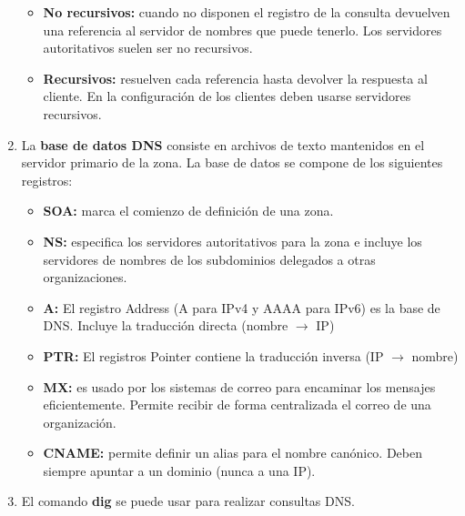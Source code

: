 \begin{enumerate}
\begin{itemize}
        \item \textbf{No recursivos: }cuando no disponen el registro de la consulta devuelven una referencia al servidor de nombres que puede tenerlo. Los servidores autoritativos suelen ser no recursivos.
        \item \textbf{Recursivos: }resuelven cada referencia hasta devolver la respuesta al cliente. En la configuración de los clientes deben usarse servidores recursivos.
    \end{itemize}
    \item La \textbf{base de datos DNS} consiste en archivos de texto  mantenidos en el servidor primario de la zona. La base de datos se compone de los siguientes registros:
    \begin{itemize}
        \item \textbf{SOA: }marca el comienzo de definición de una zona.
        \item \textbf{NS: }especifica los servidores autoritativos para la zona e incluye los servidores de nombres de los subdominios delegados a otras organizaciones.
        \item \textbf{A: }El registro Address (A para IPv4 y AAAA para IPv6) es la base de DNS. Incluye la traducción directa (nombre $\rightarrow$ IP)
        \item \textbf{PTR: }El registros Pointer contiene la traducción inversa (IP $\rightarrow$ nombre)
        \item \textbf{MX: }es usado por los sistemas de correo para encaminar los mensajes eficientemente. Permite recibir de forma centralizada el correo de una organización.
        \item \textbf{CNAME: } permite definir un alias para el nombre canónico. Deben siempre apuntar a un dominio (nunca a una IP).
    \end{itemize}
    \item El comando \textbf{dig} se puede usar para realizar consultas DNS.
\end{enumerate}
\newpage
